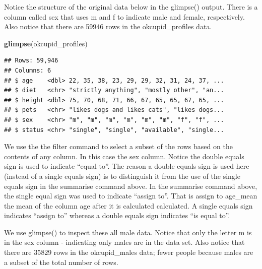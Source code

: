 \documentclass[
]{krantz}
\makeatletter
\newenvironment{Shaded}{\begin{snugshade}}{\end{snugshade}}
\newcommand{\KeywordTok}[1]{\textcolor[rgb]{0.27,0.27,0.27}{\textbf{#1}}}
\newcommand{\NormalTok}[1]{#1}
\newcommand{\OperatorTok}[1]{\textcolor[rgb]{0.43,0.43,0.43}{\textbf{#1}}}
\newcommand{\StringTok}[1]{\textcolor[rgb]{0.5,0.5,0.5}{#1}}
\newenvironment{kframe}{%
\medskip{}
\setlength{\fboxsep}{.8em}
 \def\at@end@of@kframe{}%
 \ifinner\ifhmode%
  \def\at@end@of@kframe{\end{minipage}}%
  \begin{minipage}{\columnwidth}%
 \fi\fi%
 \def\FrameCommand##1{\hskip\@totalleftmargin \hskip-\fboxsep
 \colorbox{shadecolor}{##1}\hskip-\fboxsep
     \hskip-\linewidth \hskip-\@totalleftmargin \hskip\columnwidth}%
 \MakeFramed {\advance\hsize-\width
   \@totalleftmargin\z@ \linewidth\hsize
   \@setminipage}}%
 {\par\unskip\endMakeFramed%
 \at@end@of@kframe}
\renewenvironment{Shaded}{\begin{kframe}}{\end{kframe}}
\makeatother
\begin{document}
Notice the structure of the original data below in the glimpse() output. There is a column called sex that uses m and f to indicate male and female, respectively. Also notice that there are 59946 rows in the okcupid\_profiles data.

\begin{Shaded}
\begin{Highlighting}[]
\KeywordTok{glimpse}\NormalTok{(okcupid_profiles)}
\end{Highlighting}
\end{Shaded}

\begin{verbatim}
## Rows: 59,946
## Columns: 6
## $ age    <dbl> 22, 35, 38, 23, 29, 29, 32, 31, 24, 37, ...
## $ diet   <chr> "strictly anything", "mostly other", "an...
## $ height <dbl> 75, 70, 68, 71, 66, 67, 65, 65, 67, 65, ...
## $ pets   <chr> "likes dogs and likes cats", "likes dogs...
## $ sex    <chr> "m", "m", "m", "m", "m", "m", "f", "f", ...
## $ status <chr> "single", "single", "available", "single...
\end{verbatim}

We use the the filter command to select a subset of the rows based on the contents of any column. In this case the sex column. Notice the double equals sign is used to indicate ``equal to''. The reason a double equals sign is used here (instead of a single equals sign) is to distinguish it from the use of the single equals sign in the summarise command above. In the summarise command above, the single equal sign was used to indicate ``assign to''. That is assign to age\_mean the mean of the column age after it is calculated calculated. A single equals sign indicates ``assign to'' whereas a double equals sign indicates ``is equal to''.

\begin{Shaded}
\end{Shaded}

We use glimpse() to inspect these all male data. Notice that only the letter m is in the sex column - indicating only males are in the data set. Also notice that there are 35829 rows in the okcupid\_males data; fewer people because males are a subset of the total number of rows.
\end{document}
